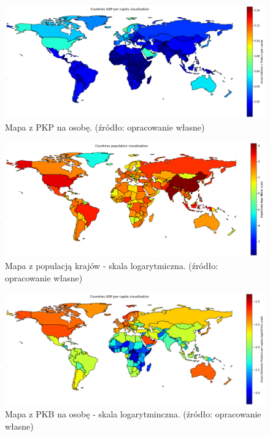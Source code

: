\documentclass[11pt]{report}
\begin{document}
    \begin{figure}[ht!]
        \centering
        \includegraphics[width=1 \textwidth]{fig/CLUST/gdp.png}
        \caption{Mapa z PKP na osobę. (źródło: opracowanie własne)}
        \label{fig:clustGDP}
    \end{figure}

    \begin{figure}[ht!]
        \centering
        \includegraphics[width=1 \textwidth]{fig/CLUST/population_log.png}
        \caption{Mapa z populacją krajów - skala logarytmiczna. (źródło: opracowanie własne)}
        \label{fig:clustPop_log}
    \end{figure}

    \begin{figure}[ht!]
        \centering
        \includegraphics[width=1 \textwidth]{fig/CLUST/gdp_log.png}
        \caption{Mapa z PKB na osobę - skala logarytminczna. (źródło: opracowanie własne)}
        \label{fig:clustGDP_log}
    \end{figure}
\end{document}
